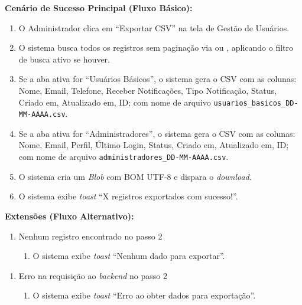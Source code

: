 \textbf{Cenário de Sucesso Principal (Fluxo Básico):}
\begin{enumerate}
  \item O Administrador clica em ``Exportar CSV'' na
        tela de Gestão de Usuários.
  \item O sistema busca todos os registros sem paginação
        via 
        ou ,
        aplicando o filtro de busca ativo se houver.
  \item Se a aba ativa for ``Usuários Básicos'', o sistema
        gera o CSV com as colunas: Nome, Email, Telefone,
        Receber Notificações, Tipo Notificação, Status,
        Criado em, Atualizado em, ID; com nome de arquivo
        \texttt{usuarios\_basicos\_DD-MM-AAAA.csv}.
  \item Se a aba ativa for ``Administradores'', o sistema
        gera o CSV com as colunas: Nome, Email, Perfil,
        Último Login, Status, Criado em, Atualizado em,
        ID; com nome de arquivo
        \texttt{administradores\_DD-MM-AAAA.csv}.
  \item O sistema cria um \textit{Blob} com BOM UTF-8
        e dispara o \textit{download}.
  \item O sistema exibe \textit{toast}
        ``X registros exportados com sucesso!''.
\end{enumerate}

\textbf{Extensões (Fluxo Alternativo):}

\begin{enumerate}
  \renewcommand{\theenumi}{2a}
  \renewcommand{\labelenumi}{\theenumi.}
  \item Nenhum registro encontrado no passo 2
  \begin{enumerate}
  \item O sistema exibe \textit{toast}
        ``Nenhum dado para exportar''.
  \end{enumerate}
\end{enumerate}

\begin{enumerate}
  \renewcommand{\theenumi}{2b}
  \renewcommand{\labelenumi}{\theenumi.}
  \item Erro na requisição ao \textit{backend} no passo 2
  \begin{enumerate}
  \item O sistema exibe \textit{toast}
        ``Erro ao obter dados para exportação''.
  \end{enumerate}
\end{enumerate}

